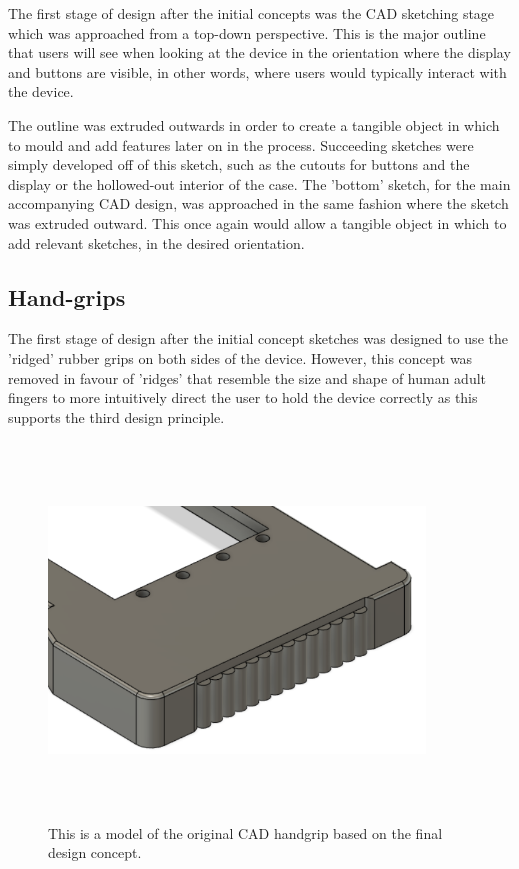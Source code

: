 The first stage of design after the initial concepts was the CAD sketching stage which was approached from a top-down perspective.
This is the major outline that users will see when looking at the device in the orientation where the display and buttons are visible, in other words, where users would typically interact with the device.

The outline was extruded outwards in order to create a tangible object in which to mould and add features later on in the process.
Succeeding sketches were simply developed off of this sketch, such as the cutouts for buttons and the display or the hollowed-out interior of the case.
The 'bottom' sketch, for the main accompanying CAD design, was approached in the same fashion where the sketch was extruded outward.
This once again would allow a tangible object in which to add relevant sketches, in the desired orientation.

\subsection{Hand-grips}

The first stage of design after the initial concept sketches was designed to use the 'ridged' rubber grips on both sides of the device.
However, this concept was removed in favour of 'ridges' that resemble the size and shape of human adult fingers to more intuitively direct the user to hold the device correctly as this supports the third design principle.

\begin{figure} [h]
    \centering
    \includegraphics[width=10cm,height=10cm,keepaspectratio]{Figures/handgrip_original.png}
    \caption{This is a model of the original CAD handgrip based on the final design concept.}
    \label{fig:Design_3}
\end{figure}

